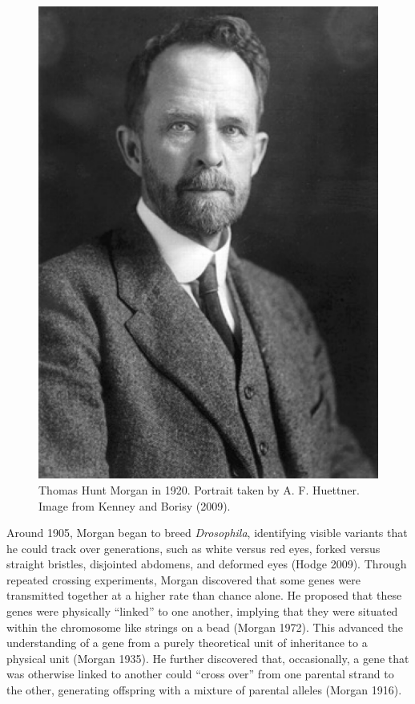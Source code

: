 \documentclass[
]{book}
\begin{document}
\begin{figure}

{\centering \includegraphics[width=0.8\linewidth]{figs/introduction/Thomas_Morgan} 

}

\caption{Thomas Hunt Morgan in 1920. Portrait taken by A. F. Huettner. Image from Kenney and Borisy (2009).}\label{fig:morgan}
\end{figure}

Around 1905, Morgan began to breed \emph{Drosophila}, identifying visible variants that he could track over generations, such as white versus red eyes, forked versus straight bristles, disjointed abdomens, and deformed eyes (Hodge 2009). Through repeated crossing experiments, Morgan discovered that some genes were transmitted together at a higher rate than chance alone. He proposed that these genes were physically ``linked'' to one another, implying that they were situated within the chromosome like strings on a bead (Morgan 1972). This advanced the understanding of a gene from a purely theoretical unit of inheritance to a physical unit (Morgan 1935). He further discovered that, occasionally, a gene that was otherwise linked to another could ``cross over'' from one parental strand to the other, generating offspring with a mixture of parental alleles (Morgan 1916).
\end{document}
